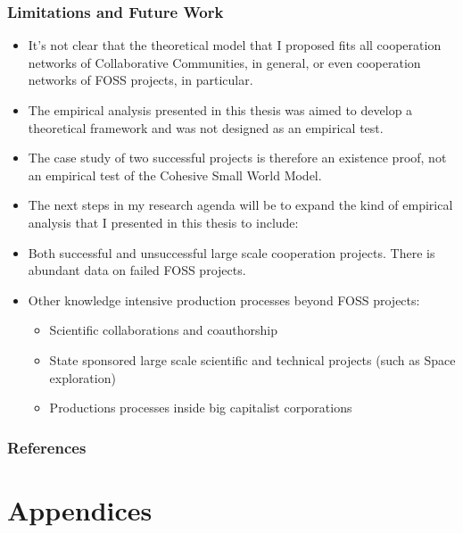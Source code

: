 \documentclass[ignorenonframetext,red,8pt,notes=hide]{beamer}
\begin{document}
\begin{frame}
\frametitle{Limitations and Future Work}

\begin{itemize}

\item It's not clear that the theoretical model that I proposed fits all cooperation networks of Collaborative Communities, in general, or even cooperation networks of FOSS projects, in particular.

\item The empirical analysis presented in this thesis was aimed to develop a theoretical framework and was not designed as an empirical test.

\item The case study of two successful projects is therefore an existence proof, not an empirical test of the Cohesive Small World Model.

\item The next steps in my research agenda will be to expand the kind of empirical analysis that I presented in this thesis to include:

\item Both successful and unsuccessful large scale cooperation projects. There is abundant data on failed FOSS projects.

\item Other knowledge intensive production processes beyond FOSS projects:

\begin{itemize}
\item Scientific collaborations and coauthorship
\item State sponsored large scale scientific and technical projects (such as Space exploration)
\item Productions processes inside big capitalist corporations  
\end{itemize}

\end{itemize}

\end{frame}


\begin{frame}[label=biblio]
\frametitle{References}
\begin{tiny}


\end{tiny}
\end{frame}

\section{Appendices}
\end{document}
